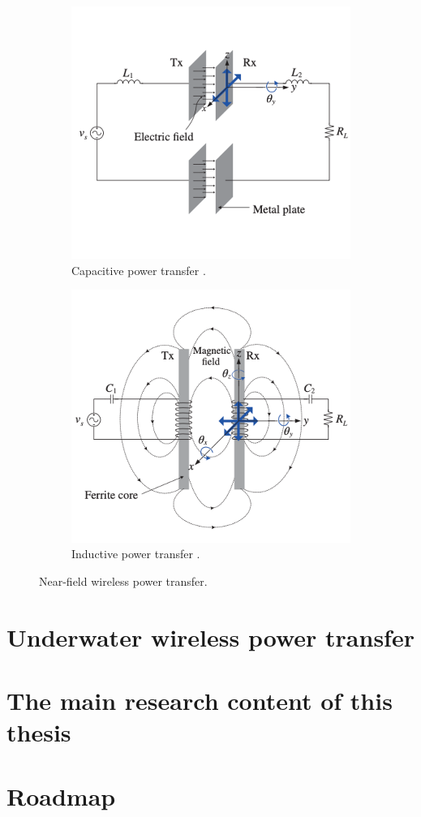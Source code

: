 \begin{figure}[htbp]
    \begin{subfigure}{0.5\textwidth}
        \centering
        \includegraphics[width=0.9\linewidth]{images/1_capacitive_power_transfer.png}
        \caption{Capacitive power transfer \cite{Chun}.}
        \label{fig:subim1}
    \end{subfigure}
    \begin{subfigure}{0.5\textwidth}
        \centering
        \includegraphics[width=0.9\linewidth]{images/1_inductive_power_transfer.png}
        \caption{Inductive power transfer \cite{Chun}.}
        \label{fig:subim2}
    \end{subfigure}

    \caption{Near-field wireless power transfer.}
    \label{fig:image2}
\end{figure}

\section{Underwater wireless power transfer}



\section{The main research content of this thesis}

\section{Roadmap}